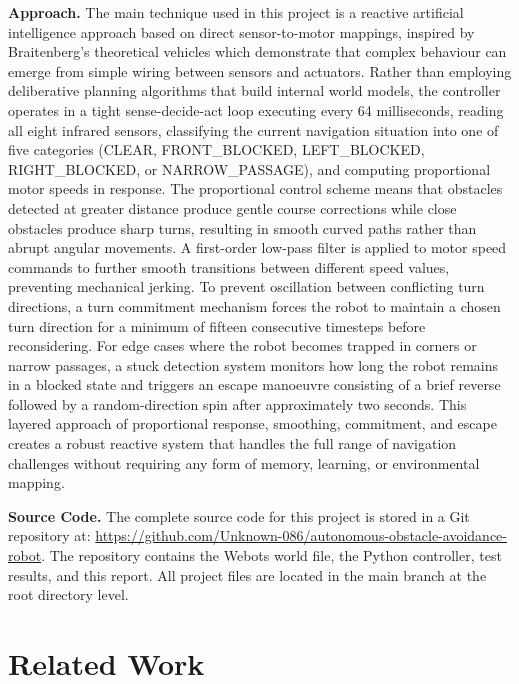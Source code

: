 \documentclass[12pt, a4paper]{article}
\begin{document}
\textbf{Approach.} The main technique used in this project is a reactive artificial intelligence approach based on direct sensor-to-motor mappings, inspired by Braitenberg's theoretical vehicles which demonstrate that complex behaviour can emerge from simple wiring between sensors and actuators. Rather than employing deliberative planning algorithms that build internal world models, the controller operates in a tight sense-decide-act loop executing every 64 milliseconds, reading all eight infrared sensors, classifying the current navigation situation into one of five categories (CLEAR, FRONT\_BLOCKED, LEFT\_BLOCKED, RIGHT\_BLOCKED, or NARROW\_PASSAGE), and computing proportional motor speeds in response. The proportional control scheme means that obstacles detected at greater distance produce gentle course corrections while close obstacles produce sharp turns, resulting in smooth curved paths rather than abrupt angular movements. A first-order low-pass filter is applied to motor speed commands to further smooth transitions between different speed values, preventing mechanical jerking. To prevent oscillation between conflicting turn directions, a turn commitment mechanism forces the robot to maintain a chosen turn direction for a minimum of fifteen consecutive timesteps before reconsidering. For edge cases where the robot becomes trapped in corners or narrow passages, a stuck detection system monitors how long the robot remains in a blocked state and triggers an escape manoeuvre consisting of a brief reverse followed by a random-direction spin after approximately two seconds. This layered approach of proportional response, smoothing, commitment, and escape creates a robust reactive system that handles the full range of navigation challenges without requiring any form of memory, learning, or environmental mapping.

\vspace{0.6cm}

\textbf{Source Code.} The complete source code for this project is stored in a Git repository at: \url{https://github.com/Unknown-086/autonomous-obstacle-avoidance-robot}. The repository contains the Webots world file, the Python controller, test results, and this report. All project files are located in the main branch at the root directory level.

\section{Related Work}
\end{document}
